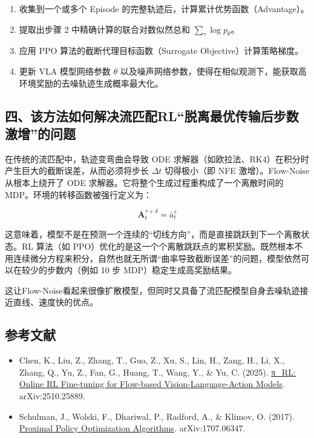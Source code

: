 \begin{enumerate}
\def\labelenumi{\arabic{enumi}.}
\tightlist
\item
  收集到一个或多个 Episode 的完整轨迹后，计算累计优势函数（Advantage）。
\item
  提取出步骤 2 中精确计算的联合对数似然总和 \(\sum_{\tau}\log p_\theta\)。
\item
  应用 PPO 算法的截断代理目标函数（Surrogate Objective）计算策略梯度。
\item
  更新 VLA 模型网络参数 \(\theta\) 以及噪声网络参数，使得在相似观测下，能获取高环境奖励的去噪轨迹生成概率最大化。
\end{enumerate}

\hypertarget{ux56dbux8be5ux65b9ux6cd5ux5982ux4f55ux89e3ux51b3ux6d41ux5339ux914drlux8131ux79bbux6700ux4f18ux4f20ux8f93ux540eux6b65ux6570ux6fc0ux589eux7684ux95eeux9898}{%
\subsection{四、该方法如何解决流匹配RL``脱离最优传输后步数激增''的问题}\label{ux56dbux8be5ux65b9ux6cd5ux5982ux4f55ux89e3ux51b3ux6d41ux5339ux914drlux8131ux79bbux6700ux4f18ux4f20ux8f93ux540eux6b65ux6570ux6fc0ux589eux7684ux95eeux9898}}

在传统的流匹配中，轨迹变弯曲会导致 ODE 求解器（如欧拉法、RK4）在积分时产生巨大的截断误差，从而必须将步长 \(\Delta t\) 切得极小（即 NFE 激增）。Flow-Noise 从根本上绕开了 ODE 求解器。它将整个生成过程重构成了一个离散时间的 MDP。环境的转移函数被强行定义为：

\[
\mathbf{A}_t^{\tau+\delta}=\bar{a}_t^\tau
\]

这意味着，模型不是在预测一个连续的``切线方向''，而是直接跳跃到下一个离散状态。RL 算法（如 PPO）优化的是这一个个离散跳跃点的累积奖励。既然根本不用连续微分方程来积分，自然也就无所谓``曲率导致截断误差''的问题，模型依然可以在较少的步数内（例如 10 步 MDP）稳定生成高奖励结果。

这让Flow-Noise看起来很像扩散模型，但同时又具备了流匹配模型自身去噪轨迹接近直线、速度快的优点。

\hypertarget{ux53c2ux8003ux6587ux732e-166}{%
\subsection{参考文献}\label{ux53c2ux8003ux6587ux732e-166}}

\begin{itemize}
\tightlist
\item
  Chen, K., Liu, Z., Zhang, T., Guo, Z., Xu, S., Lin, H., Zang, H., Li, X., Zhang, Q., Yu, Z., Fan, G., Huang, T., Wang, Y., \& Yu, C. (2025). \href{https://arxiv.org/abs/2510.25889}{π\_RL: Online RL Fine-tuning for Flow-based Vision-Language-Action Models}. arXiv:2510.25889.
\item
  Schulman, J., Wolski, F., Dhariwal, P., Radford, A., \& Klimov, O. (2017). \href{https://arxiv.org/abs/1707.06347}{Proximal Policy Optimization Algorithms}. arXiv:1707.06347.
\end{itemize}

